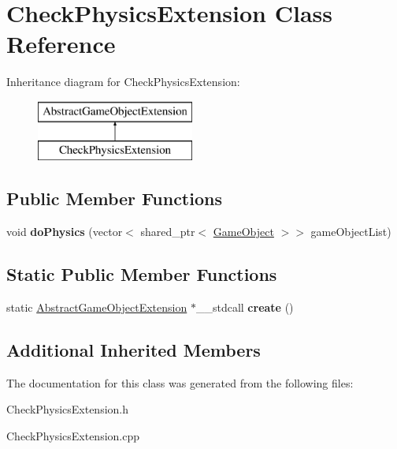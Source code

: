 \hypertarget{class_check_physics_extension}{}\section{Check\+Physics\+Extension Class Reference}
\label{class_check_physics_extension}
Inheritance diagram for Check\+Physics\+Extension\+:\begin{figure}[H]
\begin{center}
\leavevmode
\includegraphics[height=2.000000cm]{class_check_physics_extension}
\end{center}
\end{figure}
\subsection*{Public Member Functions}
\begin{DoxyCompactItemize}
\item 
\mbox{\label{class_check_physics_extension_a8a830590dbc7f53e3a785a630b6e285c}} 
void {\bfseries do\+Physics} (vector$<$ shared\+\_\+ptr$<$ \mbox{\hyperlink{class_game_object}{Game\+Object}} $>$$>$ game\+Object\+List)
\end{DoxyCompactItemize}
\subsection*{Static Public Member Functions}
\begin{DoxyCompactItemize}
\item 
\mbox{\label{class_check_physics_extension_a09d2a0a0e848825c71f044350058530e}} 
static \mbox{\hyperlink{class_abstract_game_object_extension}{Abstract\+Game\+Object\+Extension}} $\ast$\+\_\+\+\_\+stdcall {\bfseries create} ()
\end{DoxyCompactItemize}
\subsection*{Additional Inherited Members}


The documentation for this class was generated from the following files\+:\begin{DoxyCompactItemize}
\item 
Check\+Physics\+Extension.\+h\item 
Check\+Physics\+Extension.\+cpp\end{DoxyCompactItemize}
